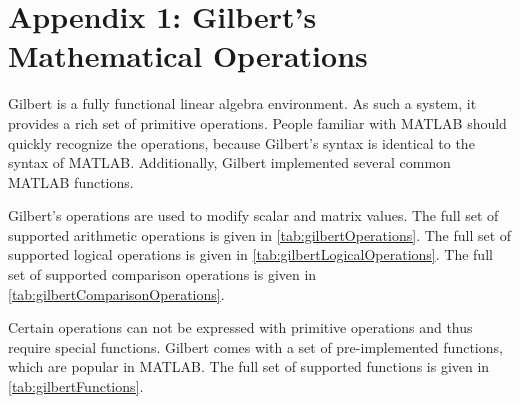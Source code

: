 \chapter{Appendix 1: Gilbert's Mathematical Operations}
\label{appendix:GilbertOps}
\appendix

\captionsetup[table]{list=no}

Gilbert is a fully functional linear algebra environment.
As such a system, it provides a rich set of primitive operations.
People familiar with MATLAB should quickly recognize the operations, because Gilbert's syntax is identical to the syntax of MATLAB.
Additionally, Gilbert implemented several common MATLAB functions.

Gilbert's operations are used to modify scalar and matrix values.
The full set of supported arithmetic operations is given in \cref{tab:gilbertOperations}.
The full set of supported logical operations is given in \cref{tab:gilbertLogicalOperations}.
The full set of supported comparison operations is given in \cref{tab:gilbertComparisonOperations}.

Certain operations can not be expressed with primitive operations and thus require special functions.
Gilbert comes with a set of pre-implemented functions, which are popular in MATLAB.
The full set of supported functions is given in \cref{tab:gilbertFunctions}.


